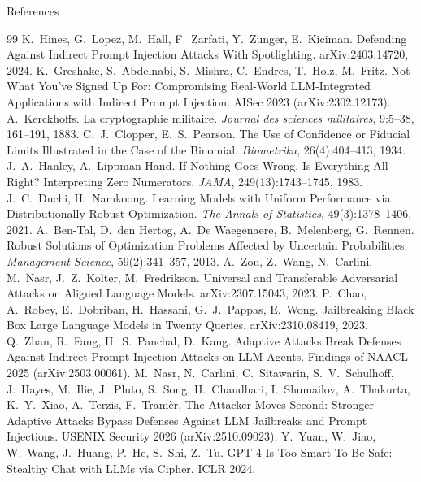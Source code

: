 \documentclass[aspectratio=169,11pt]{beamer}
\begin{document}
\begin{frame}[allowframebreaks]{References}
  \tiny
  \begin{thebibliography}{99}
      K.~Hines, G.~Lopez, M.~Hall, F.~Zarfati, Y.~Zunger, E.~Kiciman.
      \newblock Defending Against Indirect Prompt Injection Attacks With Spotlighting.
      \newblock arXiv:2403.14720, 2024.
      K.~Greshake, S.~Abdelnabi, S.~Mishra, C.~Endres, T.~Holz, M.~Fritz.
      \newblock Not What You've Signed Up For: Compromising Real-World LLM-Integrated Applications with Indirect Prompt Injection.
      \newblock AISec 2023 (arXiv:2302.12173).
      A.~Kerckhoffs.
      \newblock La cryptographie militaire.
      \newblock \emph{Journal des sciences militaires}, 9:5--38, 161--191, 1883.
      C.~J.~Clopper, E.~S.~Pearson.
      \newblock The Use of Confidence or Fiducial Limits Illustrated in the Case of the Binomial.
      \newblock \emph{Biometrika}, 26(4):404--413, 1934.
      J.~A.~Hanley, A.~Lippman-Hand.
      \newblock If Nothing Goes Wrong, Is Everything All Right? Interpreting Zero Numerators.
      \newblock \emph{JAMA}, 249(13):1743--1745, 1983.
      J.~C.~Duchi, H.~Namkoong.
      \newblock Learning Models with Uniform Performance via Distributionally Robust Optimization.
      \newblock \emph{The Annals of Statistics}, 49(3):1378--1406, 2021.
      A.~Ben-Tal, D.~den Hertog, A.~De Waegenaere, B.~Melenberg, G.~Rennen.
      \newblock Robust Solutions of Optimization Problems Affected by Uncertain Probabilities.
      \newblock \emph{Management Science}, 59(2):341--357, 2013.
      A.~Zou, Z.~Wang, N.~Carlini, M.~Nasr, J.~Z.~Kolter, M.~Fredrikson.
      \newblock Universal and Transferable Adversarial Attacks on Aligned Language Models.
      \newblock arXiv:2307.15043, 2023.
      P.~Chao, A.~Robey, E.~Dobriban, H.~Hassani, G.~J.~Pappas, E.~Wong.
      \newblock Jailbreaking Black Box Large Language Models in Twenty Queries.
      \newblock arXiv:2310.08419, 2023.
      Q.~Zhan, R.~Fang, H.~S.~Panchal, D.~Kang.
      \newblock Adaptive Attacks Break Defenses Against Indirect Prompt Injection Attacks on LLM Agents.
      \newblock Findings of NAACL 2025 (arXiv:2503.00061).
      M.~Nasr, N.~Carlini, C.~Sitawarin, S.~V.~Schulhoff, J.~Hayes, M.~Ilie, J.~Pluto, S.~Song, H.~Chaudhari, I.~Shumailov, A.~Thakurta, K.~Y.~Xiao, A.~Terzis, F.~Tram\`er.
      \newblock The Attacker Moves Second: Stronger Adaptive Attacks Bypass Defenses Against LLM Jailbreaks and Prompt Injections.
      \newblock USENIX Security 2026 (arXiv:2510.09023).
      Y.~Yuan, W.~Jiao, W.~Wang, J.~Huang, P.~He, S.~Shi, Z.~Tu.
      \newblock GPT-4 Is Too Smart To Be Safe: Stealthy Chat with LLMs via Cipher.
      \newblock ICLR 2024.
  \end{thebibliography}
\end{frame}
\end{document}

